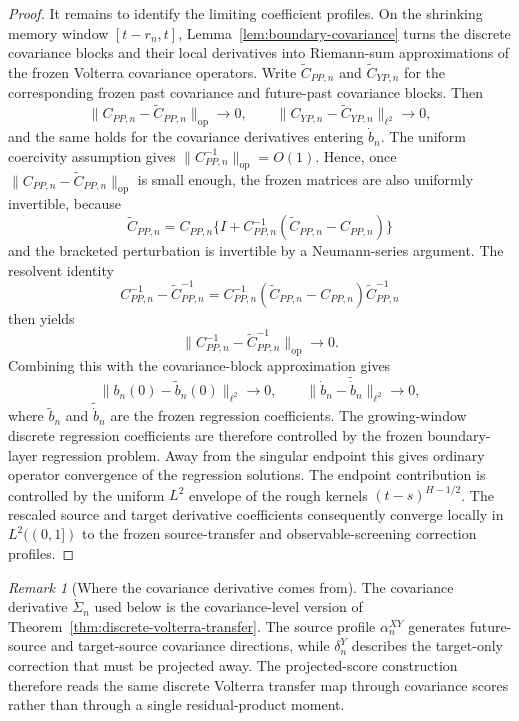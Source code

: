 \documentclass[11pt,a4paper]{amsart}
\theoremstyle{plain}
\theoremstyle{definition}
\theoremstyle{remark}
\newtheorem{remark}[theorem]{Remark}
\begin{document}
\begin{proof}
It remains to identify the limiting coefficient profiles.  On the shrinking memory window
\([t-r_n,t]\), Lemma~\ref{lem:boundary-covariance} turns the discrete covariance blocks and their
local derivatives into Riemann-sum approximations of the frozen Volterra covariance operators.
Write \(\widetilde C_{PP,n}\) and \(\widetilde C_{YP,n}\) for the corresponding frozen past
covariance and future-past covariance blocks.  Then
\[
        \|C_{PP,n}-\widetilde C_{PP,n}\|_{\mathrm{op}}\to0,
        \qquad
        \|C_{YP,n}-\widetilde C_{YP,n}\|_{\ell^2}\to0,
\]
and the same holds for the covariance derivatives entering \(\dot b_n\).  The uniform coercivity
assumption gives \(\|C_{PP,n}^{-1}\|_{\mathrm{op}}=O(1)\).  Hence, once
\(\|C_{PP,n}-\widetilde C_{PP,n}\|_{\mathrm{op}}\) is small enough, the frozen matrices are also
uniformly invertible, because
\[
        \widetilde C_{PP,n}
        =
        C_{PP,n}\{I+C_{PP,n}^{-1}(\widetilde C_{PP,n}-C_{PP,n})\}
\]
and the bracketed perturbation is invertible by a Neumann-series argument.  The resolvent identity
\[
        C_{PP,n}^{-1}-\widetilde C_{PP,n}^{-1}
        =
        C_{PP,n}^{-1}(\widetilde C_{PP,n}-C_{PP,n})\widetilde C_{PP,n}^{-1}
\]
then yields
\[
        \|C_{PP,n}^{-1}-\widetilde C_{PP,n}^{-1}\|_{\mathrm{op}}\to0.
\]
Combining this with the covariance-block approximation gives
\[
        \|b_n(0)-\widetilde b_n(0)\|_{\ell^2}\to0,
        \qquad
        \|\dot b_n-\widetilde{\dot b}_n\|_{\ell^2}\to0,
\]
where \(\widetilde b_n\) and \(\widetilde{\dot b}_n\) are the frozen regression coefficients.  The
growing-window discrete regression coefficients are therefore controlled by the frozen
boundary-layer regression problem.  Away from the singular endpoint this gives ordinary operator
convergence of the regression solutions.  The endpoint contribution is controlled by the uniform
\(L^2\) envelope of the rough kernels \((t-s)^{H-1/2}\).  The rescaled source and target derivative
coefficients consequently converge locally in \(L^2((0,1])\) to the frozen source-transfer and
observable-screening correction profiles.
\end{proof}

\begin{remark}[Where the covariance derivative comes from]
The covariance derivative \(\dot\Sigma_n\) used below is the covariance-level version of
Theorem~\ref{thm:discrete-volterra-transfer}.  The source profile
\(\alpha_n^{XY}\) generates future-source and target-source covariance directions, while
\(\delta_n^Y\) describes the target-only correction that must be projected away.  The
projected-score construction therefore reads the same discrete Volterra transfer map through
covariance scores rather than through a single residual-product moment.
\end{remark}
\end{document}
